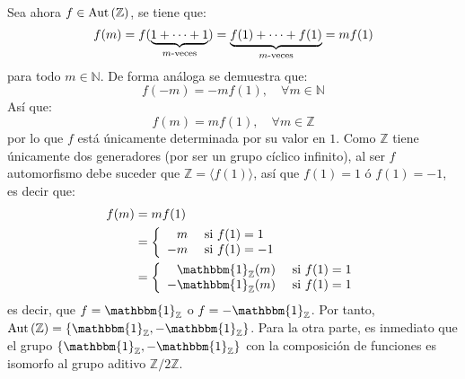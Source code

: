 \documentclass[12pt]{report}
\newcounter{it}
\theoremstyle{largebreak}
\newcommand{\bbm}[1]{\ensuremath{\mathbbm{#1}}}
\newcommand{\Aut}[1]{\ensuremath{\textup{Aut}\left(#1\right)}}
\newcommand{\gen}[1]{\ensuremath{\langle#1\rangle}}
\begin{document}
\begin{sol}
        Sea ahora $f\in\Aut{\mathbb{Z}}$, se tiene que:
        \begin{equation*}
            f(m)=f(\underset{m\textup{-veces}}{\underbrace{1+\cdots+1}})=\underset{m\textup{-veces}}{\underbrace{f(1)+\cdots+f(1)}}=mf(1)
        \end{equation*}
        para todo $m\in\mathbb{N}$. De forma análoga se demuestra que:
        \begin{equation*}
            f(-m)=-mf(1),\quad\forall m\in\mathbb{N}
        \end{equation*}
        Así que:
        \begin{equation*}
            f(m)=mf(1),\quad\forall m\in\mathbb{Z}
        \end{equation*}
        por lo que $f$ está únicamente determinada por su valor en $1$. Como $\mathbb{Z}$ tiene únicamente dos generadores (por ser un grupo cíclico infinito), al ser $f$ automorfismo debe suceder que $\mathbb{Z}=\gen{f(1)}$, así que $f(1)=1$ ó $f(1)=-1$, es decir que:
        \begin{equation*}
            \begin{split}
                f(m)&=mf(1)\\
                &=\left\{
                    \begin{array}{rl}
                        m & \textup{ si }f(1) = 1\\
                        -m & \textup{ si }f(1) = -1\\
                    \end{array}
                \right.\\
                &=\left\{
                    \begin{array}{rl}
                        \bbm{1}_\mathbb{Z}(m)& \textup{ si }f(1) = 1\\
                        -\bbm{1}_\mathbb{Z}(m)& \textup{ si }f(1) = 1\\
                    \end{array}
                 \right.\\
            \end{split}
        \end{equation*}
        es decir, que $f=\bbm{1}_\mathbb{Z}$ o $f=-\bbm{1}_{\mathbb{Z}}$. Por tanto, $\Aut{\mathbb{Z}}=\left\{\bbm{1}_\mathbb{Z},-\bbm{1}_\mathbb{Z}\right\}$. Para la otra parte, es inmediato que el grupo $\left\{\bbm{1}_\mathbb{Z},-\bbm{1}_\mathbb{Z}\right\}$ con la composición de funciones es isomorfo al grupo aditivo $\mathbb{Z}/2\mathbb{Z}$.
    \end{sol}
\end{document}
